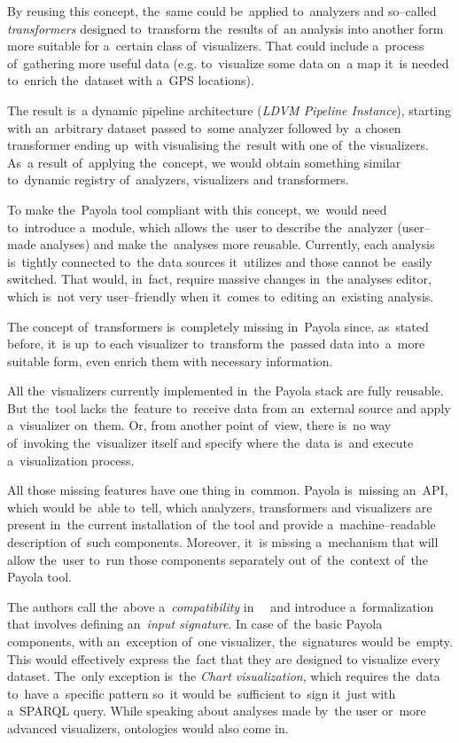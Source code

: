 By reusing this concept, the~same could be~applied to~analyzers and so--called 
\emph{transformers} designed to~transform the~results of~an analysis 
into another form more suitable for a~certain class of~visualizers. 
That could include a~process of~gathering more useful data (e.g. to~visualize 
some data on~a map it~is needed to~enrich the~dataset with a~GPS locations).

The result is~a dynamic pipeline architecture (\emph{LDVM Pipeline Instance}),
starting with an~arbitrary 
dataset passed to~some analyzer followed by~a chosen transformer ending up~with
visualising the~result with one of~the visualizers. As~a result of~applying the~concept,
we would obtain something similar to~dynamic 
registry of~analyzers, visualizers and transformers.

To make the~Payola tool 
compliant with this concept, we~would need to~introduce a~module, which allows the~user
to describe the~analyzer (user--made analyses) and make the~analyses more reusable. Currently, each analysis is~tightly connected to~the 
data sources it~utilizes and those cannot be~easily switched. That would, in~fact, require massive changes in~the analyses editor, which is~not very 
user--friendly when it~comes to~editing an~existing analysis.

The concept of~transformers is~completely missing in~Payola since, as~stated 
before, it~is up~to each visualizer to~transform the~passed data into~a~more 
suitable form, even enrich them with necessary information.

All the~visualizers currently implemented in~the Payola stack are fully 
reusable. But the~tool lacks the~feature to~receive data from an~external source 
and apply a~visualizer on~them. Or, from another point of~view, there is~no 
way of~invoking the~visualizer itself and specify where the~data is~and execute a~visualization process.

All those missing features have one thing in~common. Payola is~missing 
an~API, which would be~able to~tell, which analyzers, transformers and 
visualizers are present in~the current installation of~the tool and provide a~machine--readable description of~such components. Moreover, it~is missing a~mechanism that will allow the~user to~run those components separately out of~the~context of~the Payola tool.

The authors call the~above a~\emph{compatibility} in~~\cite{ldvm2} and 
introduce a~formalization that involves defining an~\emph{input signature}.
In case of~the basic Payola components, with an~exception of~one visualizer, the~signatures
would be~empty. This would effectively express the~fact that they are designed to
visualize every dataset. The~only exception is~the \emph{Chart visualization},
which requires the~data to~have a~specific pattern so~it would be~sufficient to~sign it~just with a~SPARQL query. While speaking about analyses made by~the user or~more 
advanced visualizers, ontologies would also come in.


